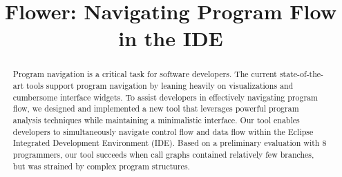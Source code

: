 \documentclass[conference]{IEEEtran}
\newcommand{\toolName}{Flower}
\begin{document}
%
\title{\toolName: Navigating Program Flow in the IDE}


\author{
}

\maketitle

\begin{abstract}
Program navigation is a critical task for software developers. 
The current state-of-the-art tools support program navigation by leaning heavily on visualizations and cumbersome interface widgets.
To assist developers in effectively navigating program flow, we designed and implemented a new tool that leverages powerful program analysis techniques while maintaining a minimalistic interface.
Our tool enables developers to simultaneously navigate control flow and data flow within the Eclipse Integrated Development Environment (IDE).
Based on a preliminary evaluation with 8 programmers, our tool succeeds when call graphs contained relatively few branches, but was strained by complex program structures. 
\end{abstract}
\end{document}
